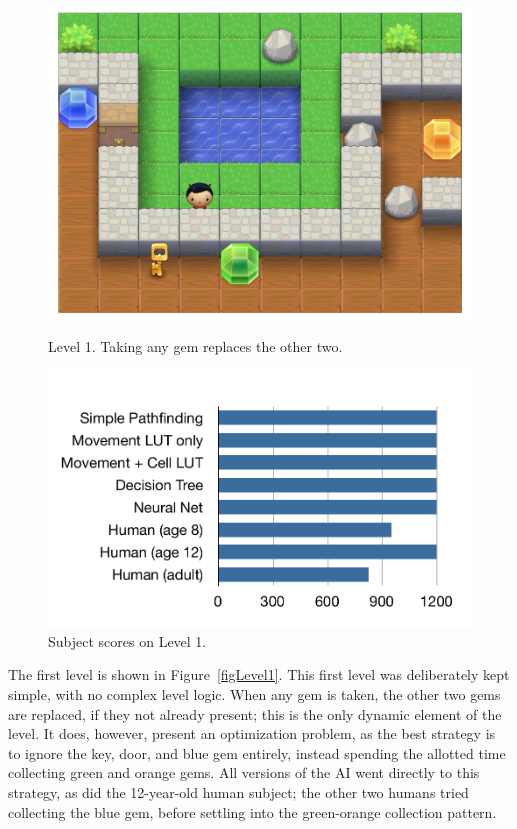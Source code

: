 \documentclass{article}
\begin{document}
\begin{figure}[ht]
\begin{minipage}[t]{0.45\linewidth}
\centering
\includegraphics[width=\textwidth]{figLevel1.pdf}
\caption{Level 1. Taking any gem replaces the other two.}
\label{figLevel1}
\end{minipage}
\hspace{0.5cm}
\begin{minipage}[b]{0.45\linewidth}
\centering
\includegraphics[width=\textwidth]{figScores1.pdf}
\caption{Subject scores on Level 1.}
\label{figScores1}
\end{minipage}
\end{figure}

The first level is shown in Figure~\ref{figLevel1}.  This first level was deliberately kept simple, with no complex level logic.  When any gem is taken, the other two gems are replaced, if they not already present; this is the only dynamic element of the level.  It does, however, present an optimization problem, as the best strategy is to ignore the key, door, and blue gem entirely, instead spending the allotted time collecting green and orange gems.  All versions of the AI went directly to this strategy, as did the 12-year-old human subject; the other two humans tried collecting the blue gem, before settling into the green-orange collection pattern.
\end{document}
